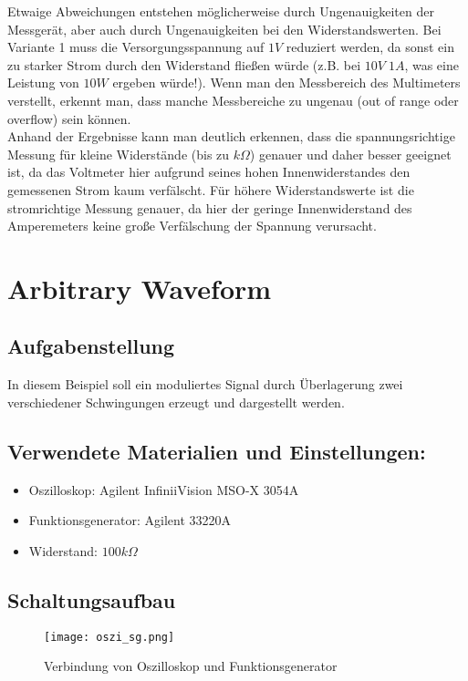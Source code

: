 \documentclass[12pt,a4paper,titlepage]{article}
\begin{document}
\noindent Etwaige Abweichungen entstehen möglicherweise durch Ungenauigkeiten der Messgerät, aber auch durch Ungenauigkeiten bei den Widerstandswerten. Bei Variante 1 muss die Versorgungsspannung auf $1V$ reduziert werden, da sonst ein zu starker Strom durch den Widerstand fließen würde (z.B. bei $10V\;1A$, was eine Leistung von $10W$ ergeben würde!). Wenn man den Messbereich des Multimeters verstellt, erkennt man, dass manche Messbereiche zu ungenau (out of range oder overflow) sein können.\\
Anhand der Ergebnisse kann man deutlich erkennen, dass die spannungsrichtige Messung für kleine Widerstände (bis zu $k\Omega$) genauer und daher besser geeignet ist, da das Voltmeter hier aufgrund seines hohen Innenwiderstandes den gemessenen Strom kaum verfälscht. Für höhere Widerstandswerte ist die stromrichtige Messung genauer, da hier der geringe Innenwiderstand des Amperemeters keine große Verfälschung der Spannung verursacht.

\section{Arbitrary Waveform}

\subsection{Aufgabenstellung}
In diesem Beispiel soll ein moduliertes Signal durch Überlagerung zwei verschiedener Schwingungen erzeugt und dargestellt werden.

\subsection{Verwendete Materialien und Einstellungen:}
\begin{itemize}
  \item Oszilloskop: Agilent InfiniiVision MSO-X 3054A
  \item Funktionsgenerator: Agilent 33220A
  \item Widerstand: $100k\Omega$
\end{itemize}

\subsection{Schaltungsaufbau}
\begin{figure}[H]
  \centering
  \texttt{[image: oszi\_sg.png]}
  \caption{Verbindung von Oszilloskop und Funktionsgenerator}
\end{figure}
\end{document}
